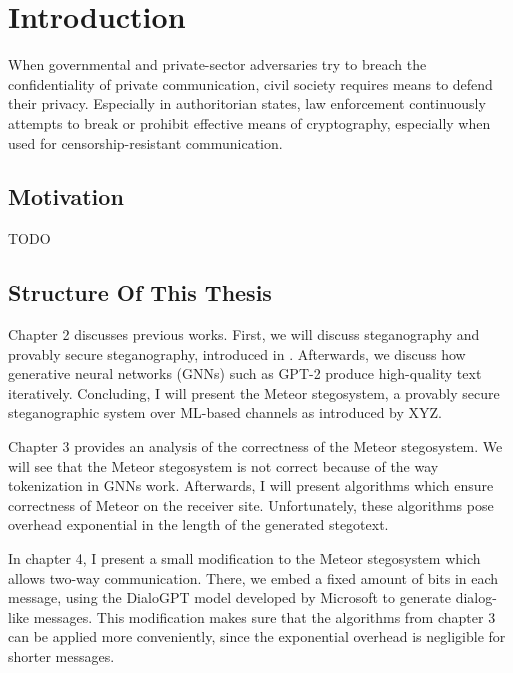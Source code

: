 \documentclass[english,version-2020-11]{uzl-thesis}
\begin{document}
%
%



%

\chapter{Introduction}

When governmental and private-sector adversaries try to breach the confidentiality of private communication, civil society requires means to defend their privacy.
Especially in authoritorian states, law enforcement continuously attempts to break or prohibit effective means of cryptography, especially when used for censorship-resistant communication.

\section{Motivation}

TODO

\section{Structure Of This Thesis}

Chapter 2 discusses previous works.
First, we will discuss steganography and provably secure steganography, introduced in \cite{Hopper04}.
Afterwards, we discuss how generative neural networks (GNNs) such as GPT-2 produce high-quality text iteratively.
Concluding, I will present the Meteor stegosystem, a provably secure steganographic system over ML-based channels as introduced by XYZ.

Chapter 3 provides an analysis of the correctness of the Meteor stegosystem. 
We will see that the Meteor stegosystem is not correct because of the way tokenization in GNNs work.
Afterwards, I will present algorithms which ensure correctness of Meteor on the receiver site.
Unfortunately, these algorithms pose overhead exponential in the length of the generated stegotext.

In chapter 4, I present a small modification to the Meteor stegosystem which allows two-way communication.
There, we embed a fixed amount of bits in each message, using the DialoGPT model developed by Microsoft \cite{Zhang20} to generate dialog-like messages.
This modification makes sure that the algorithms from chapter 3 can be applied more conveniently, since the exponential overhead is negligible for shorter messages.
\end{document}
